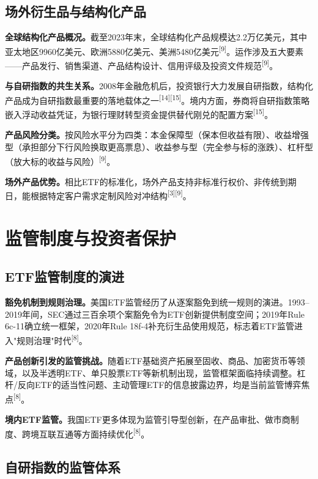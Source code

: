 \documentclass[10pt,a4paper,twocolumn]{ctexart}
\begin{document}
\subsection{场外衍生品与结构化产品}

\textbf{全球结构化产品概况。}截至2023年末，全球结构化产品规模达2.2万亿美元，其中亚太地区9960亿美元、欧洲5880亿美元、美洲5480亿美元\textsuperscript{[9]}。运作涉及五大要素——产品发行、销售渠道、产品结构设计、信用评级及投资文件规范\textsuperscript{[9]}。

\textbf{与自研指数的共生关系。}2008年金融危机后，投资银行大力发展自研指数，结构化产品成为自研指数最重要的落地载体之一\textsuperscript{[14][15]}。境内方面，券商将自研指数策略嵌入浮动收益凭证，为银行理财转型资金提供替代刚兑的配置方案\textsuperscript{[15]}。

\textbf{产品风险分类。}按风险水平分为四类：本金保障型（保本但收益有限）、收益增强型（承担部分下行风险换取更高票息）、收益参与型（完全参与标的涨跌）、杠杆型（放大标的收益与风险）\textsuperscript{[9]}。

\textbf{场外产品优势。}相比ETF的标准化，场外产品支持非标准行权价、非传统到期日，能根据特定客户需求定制风险对冲结构\textsuperscript{[3][9]}。

\section{监管制度与投资者保护}

\subsection{ETF监管制度的演进}

\textbf{豁免机制到规则治理。}美国ETF监管经历了从逐案豁免到统一规则的演进。1993--2019年间，SEC通过三百余项个案豁免令为ETF创新提供制度空间；2019年Rule 6c-11确立统一框架，2020年Rule 18f-4补充衍生品使用规范，标志着ETF监管进入"规则治理"时代\textsuperscript{[8]}。

\textbf{产品创新引发的监管挑战。}随着ETF基础资产拓展至固收、商品、加密货币等领域，以及半透明ETF、单只股票ETF等新机制出现，监管框架面临持续调整。杠杆/反向ETF的适当性问题、主动管理ETF的信息披露边界，均是当前监管博弈焦点\textsuperscript{[8]}。

\textbf{境内ETF监管。}我国ETF更多体现为监管引导型创新，在产品审批、做市商制度、跨境互联互通等方面持续优化\textsuperscript{[8]}。

\subsection{自研指数的监管体系}
\end{document}

